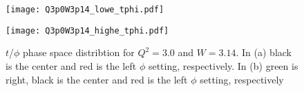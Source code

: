 \begin{figure}
  \centering
  \begin{minipage}[b]{0.48\linewidth}
    \texttt{[image: Q3p0W3p14\_lowe\_tphi.pdf]}
  \end{minipage}
  \hfill
  \begin{minipage}[b]{0.48\linewidth}
    \texttt{[image: Q3p0W3p14\_highe\_tphi.pdf]}
  \end{minipage}  
  \caption{$t$/$\phi$ phase space distribtion for $Q^2=3.0$ and $W=3.14$. In (a) black is the center and red is the left $\phi$ setting, respectively. In (b) green is right, black is the center and red is the left $\phi$ setting, respectively}
  \label{fig:Q3p0W3p14_tphi}
\end{figure}

